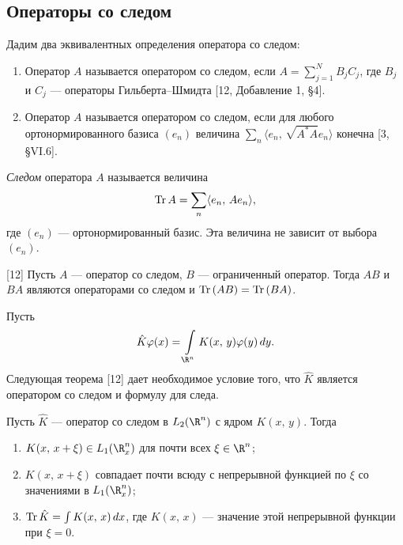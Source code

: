\documentclass[a4paper
]{article}
\begin{document}
\subsection{Операторы со следом}
Дадим два эквивалентных определения оператора со следом:
\begin{enumerate}
\item Оператор $A$ называется оператором со следом, если
$A=\sum \limits_{j=1}^N B_jC_j$, где $B_j$ и $C_j$ --- операторы
Гильберта--Шмидта [12, Добавление 1, \S 4].
\item Оператор $A$ называется оператором со следом, если для любого
ортонормированного базиса $(e_n)$ величина $\sum \limits_n \langle e_n, \,
\sqrt{A^*A}e_n\rangle$ конечна [3, \S VI.6].
\end{enumerate}
{\it Следом} оператора $A$ называется величина
$${\rm Tr}\, A=\sum \limits_n \langle e_n, \, Ae_n\rangle,$$ где $(e_n)$ ---
ортонормированный базис. Эта величина не зависит от выбора $(e_n)$.
\begin{Sta}
{\rm [12]}
Пусть $A$ --- оператор со следом, $B$ --- ограниченный оператор. Тогда
$AB$ и $BA$ являются операторами со следом и ${\rm Tr}\, (AB)={\rm Tr}\,
(BA)$.
\end{Sta}
Пусть $$\hat K\varphi(x)=\int \limits_{\R^n}K(x, \, y)\varphi(y)\, dy.$$
Следующая теорема [12] дает необходимое условие того, что
$\hat K$ является оператором со следом и формулу для следа.
\begin{Trm}
\label{trace_int_oper}
Пусть $\hat K$ --- оператор со следом в $L_2(\R^n)$ с ядром $K(x, \, y)$.
Тогда
\begin{enumerate}
\item $K(x, \, x+\xi)\in L_1(\R^n_x)$ для почти всех $\xi\in \R^n$;
\item $K(x, \, x+\xi)$ совпадает почти всюду с непрерывной функцией
по $\xi$ со значениями в $L_1(\R^n_x)$;
\item ${\rm Tr}\, \hat K=\int K(x, \, x)\, dx$, где $K(x, \, x)$ ---
значение этой непрерывной функции при $\xi=0$.
\end{enumerate}
\end{Trm}
\end{document}
